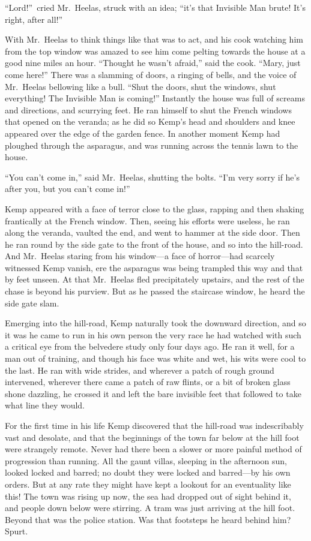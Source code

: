 “Lord!”\ cried Mr.\ Heelas, struck with an idea; “it’s that Invisible Man brute! It’s right, after all!”

With Mr.\ Heelas to think things like that was to act, and his cook watching him from the top window was amazed to see him come pelting towards the house at a good nine miles an hour. “Thought he wasn’t afraid,” said the cook. “Mary, just come here!” There was a slamming of doors, a ringing of bells, and the voice of Mr.\ Heelas bellowing like a bull. “Shut the doors, shut the windows, shut everything! The Invisible Man is coming!” Instantly the house was full of screams and directions, and scurrying feet. He ran himself to shut the French windows that opened on the veranda; as he did so Kemp’s head and shoulders and knee appeared over the edge of the garden fence. In another moment Kemp had ploughed through the asparagus, and was running across the tennis lawn to the house.

“You can’t come in,” said Mr.\ Heelas, shutting the bolts. “I’m very sorry if he’s after you, but you can’t come in!”

Kemp appeared with a face of terror close to the glass, rapping and then shaking frantically at the French window. Then, seeing his efforts were useless, he ran along the veranda, vaulted the end, and went to hammer at the side door. Then he ran round by the side gate to the front of the house, and so into the hill-road. And Mr.\ Heelas staring from his window—a face of horror—had scarcely witnessed Kemp vanish, ere the asparagus was being trampled this way and that by feet unseen. At that Mr.\ Heelas fled precipitately upstairs, and the rest of the chase is beyond his purview. But as he passed the staircase window, he heard the side gate slam.

Emerging into the hill-road, Kemp naturally took the downward direction, and so it was he came to run in his own person the very race he had watched with such a critical eye from the belvedere study only four days ago. He ran it well, for a man out of training, and though his face was white and wet, his wits were cool to the last. He ran with wide strides, and wherever a patch of rough ground intervened, wherever there came a patch of raw flints, or a bit of broken glass shone dazzling, he crossed it and left the bare invisible feet that followed to take what line they would.

For the first time in his life Kemp discovered that the hill-road was indescribably vast and desolate, and that the beginnings of the town far below at the hill foot were strangely remote. Never had there been a slower or more painful method of progression than running. All the gaunt villas, sleeping in the afternoon sun, looked locked and barred; no doubt they were locked and barred—by his own orders. But at any rate they might have kept a lookout for an eventuality like this! The town was rising up now, the sea had dropped out of sight behind it, and people down below were stirring. A tram was just arriving at the hill foot. Beyond that was the police station. Was that footsteps he heard behind him? Spurt.

